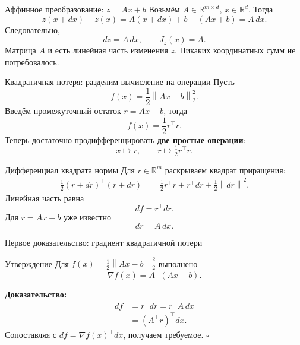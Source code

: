\documentclass[aspectratio=169,10pt]{beamer}
\newcommand{\R}{\mathbb{R}}
\newcommand{\norm}[1]{\left\lVert #1\right\rVert}
\newcommand{\grad}{\nabla}
\begin{document}
\begin{frame}{Аффинное преобразование: $z=Ax+b$}
\small
Возьмём $A\in\R^{m\times d}$, $x\in\R^d$. Тогда
\[
z(x+dx)-z(x)=A(x+dx)+b-(Ax+b)=A\,dx.
\]
Следовательно,
\[
\boxed{dz=A\,dx,\qquad J_z(x)=A.}
\]
Матрица $A$ и есть линейная часть изменения $z$. Никаких координатных сумм не потребовалось.
\end{frame}

\begin{frame}{Квадратичная потеря: разделим вычисление на операции}
\small
Пусть
\[
\boxed{f(x)=\frac12\norm{Ax-b}_2^2.}
\]
Введём промежуточный остаток $r=Ax-b$, тогда
\[
 f(x)=\frac12r^\top r.
\]
Теперь достаточно продифференцировать \textbf{две простые операции}:
\[
 x\longmapsto r,\qquad r\longmapsto \tfrac12r^\top r.
\]
\end{frame}

\begin{frame}{Дифференциал квадрата нормы}
\small
Для $r\in\R^m$ раскрываем квадрат приращения:
\[
\begin{aligned}
\tfrac12(r+dr)^\top(r+dr)
&=\tfrac12r^\top r+r^\top dr+\tfrac12\norm{dr}^2.
\end{aligned}
\]
Линейная часть равна
\[
\boxed{df=r^\top dr.}
\]
Для $r=Ax-b$ уже известно
\[
\boxed{dr=A\,dx.}
\]
\end{frame}

\begin{frame}{Первое доказательство: градиент квадратичной потери}
\small
\begin{block}{Утверждение}
Для $f(x)=\frac12\norm{Ax-b}_2^2$ выполнено
\[
\boxed{\grad f(x)=A^\top(Ax-b).}
\]
\end{block}
\textbf{Доказательство:}
\[
\begin{aligned}
df&=r^\top dr=r^\top A\,dx\\
  &=(A^\top r)^\top dx.
\end{aligned}
\]
Сопоставляя с $df=\grad f(x)^\top dx$, получаем требуемое. $\square$
\end{frame}
\end{document}
